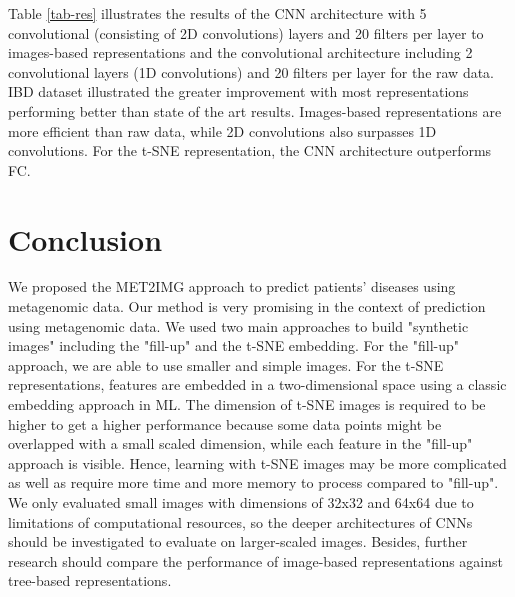 \documentclass{article}
\begin{document}
Table \ref{tab-res} illustrates the results of the CNN architecture with 5 convolutional (consisting of 2D convolutions) layers and 20 filters per layer to images-based representations and the convolutional architecture including 2 convolutional layers (1D convolutions) and 20 filters per layer for the raw data. IBD dataset illustrated the greater improvement with most representations performing better than state of the art results. Images-based representations are more efficient than raw data, while 2D convolutions also surpasses 1D convolutions. For the t-SNE representation, the CNN architecture outperforms FC.
\section{Conclusion}
We proposed the MET2IMG approach to predict patients' diseases using metagenomic data. Our method is very promising in the context of prediction using metagenomic data. We used two main approaches to build "synthetic images" including the "fill-up" and the t-SNE embedding. For the "fill-up" approach, we are able to use smaller and simple images. For the t-SNE representations,  features are embedded in a two-dimensional space using a classic embedding approach in ML. The dimension of t-SNE images is required to be higher to get a higher performance because some data points might be overlapped with a small scaled dimension, while each feature in the "fill-up" approach is visible. Hence, learning with t-SNE images may be more complicated as well as require more time and more memory to process compared to "fill-up". We only evaluated small images with dimensions of 32x32 and 64x64 due to limitations of computational resources, so the deeper architectures of CNNs should be investigated to evaluate on larger-scaled images. Besides, further research should compare the performance of image-based representations against tree-based representations. 

\end{document}
